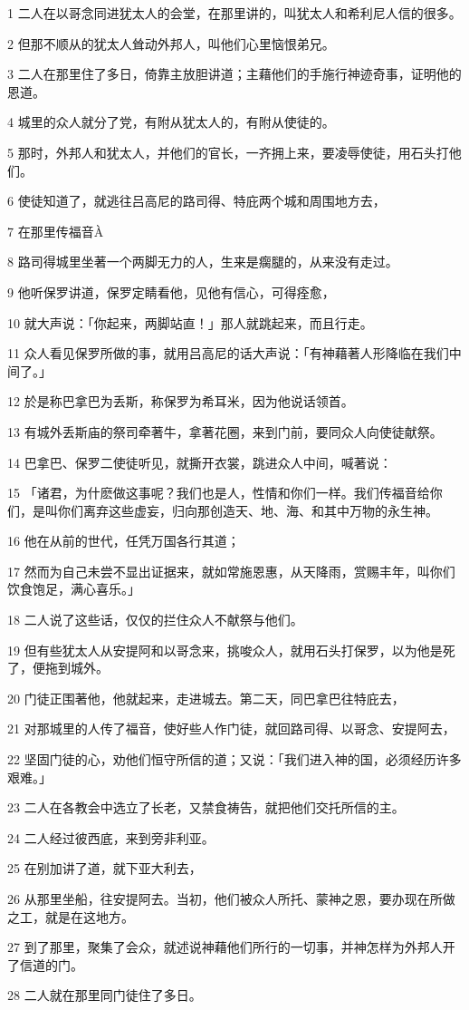\par 1 二人在以哥念同进犹太人的会堂，在那里讲的，叫犹太人和希利尼人信的很多。
\par 2 但那不顺从的犹太人耸动外邦人，叫他们心里恼恨弟兄。
\par 3 二人在那里住了多日，倚靠主放胆讲道；主藉他们的手施行神迹奇事，证明他的恩道。
\par 4 城里的众人就分了党，有附从犹太人的，有附从使徒的。
\par 5 那时，外邦人和犹太人，并他们的官长，一齐拥上来，要凌辱使徒，用石头打他们。
\par 6 使徒知道了，就逃往吕高尼的路司得、特庇两个城和周围地方去，
\par 7 在那里传福音À
\par 8 路司得城里坐著一个两脚无力的人，生来是瘸腿的，从来没有走过。
\par 9 他听保罗讲道，保罗定睛看他，见他有信心，可得痊愈，
\par 10 就大声说：「你起来，两脚站直！」那人就跳起来，而且行走。
\par 11 众人看见保罗所做的事，就用吕高尼的话大声说：「有神藉著人形降临在我们中间了。」
\par 12 於是称巴拿巴为丢斯，称保罗为希耳米，因为他说话领首。
\par 13 有城外丢斯庙的祭司牵著牛，拿著花圈，来到门前，要同众人向使徒献祭。
\par 14 巴拿巴、保罗二使徒听见，就撕开衣裳，跳进众人中间，喊著说：
\par 15 「诸君，为什麽做这事呢？我们也是人，性情和你们一样。我们传福音给你们，是叫你们离弃这些虚妄，归向那创造天、地、海、和其中万物的永生神。
\par 16 他在从前的世代，任凭万国各行其道；
\par 17 然而为自己未尝不显出证据来，就如常施恩惠，从天降雨，赏赐丰年，叫你们饮食饱足，满心喜乐。」
\par 18 二人说了这些话，仅仅的拦住众人不献祭与他们。
\par 19 但有些犹太人从安提阿和以哥念来，挑唆众人，就用石头打保罗，以为他是死了，便拖到城外。
\par 20 门徒正围著他，他就起来，走进城去。第二天，同巴拿巴往特庇去，
\par 21 对那城里的人传了福音，使好些人作门徒，就回路司得、以哥念、安提阿去，
\par 22 坚固门徒的心，劝他们恒守所信的道；又说：「我们进入神的国，必须经历许多艰难。」
\par 23 二人在各教会中选立了长老，又禁食祷告，就把他们交托所信的主。
\par 24 二人经过彼西底，来到旁非利亚。
\par 25 在别加讲了道，就下亚大利去，
\par 26 从那里坐船，往安提阿去。当初，他们被众人所托、蒙神之恩，要办现在所做之工，就是在这地方。
\par 27 到了那里，聚集了会众，就述说神藉他们所行的一切事，并神怎样为外邦人开了信道的门。
\par 28 二人就在那里同门徒住了多日。

